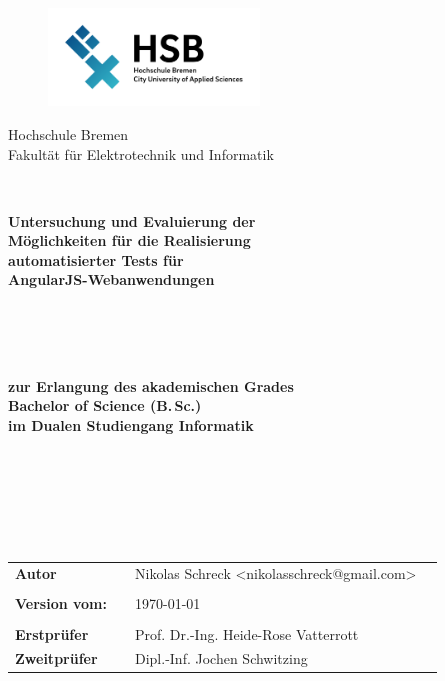 \thispagestyle{empty}


\begin{figure}[t]
 \centering
 \includegraphics[width=0.5\textwidth]{abb/logo}
\end{figure}

\begin{center}
\Large{Hochschule Bremen}\\
\Large{Fakultät für Elektrotechnik und Informatik}\\
\end{center}



\begin{verbatim}


\end{verbatim}
\begin{center}
\onehalfspacing
\textbf{\LARGE{Untersuchung und Evaluierung der \\ Möglichkeiten für die Realisierung \\ automatisierter Tests für \\AngularJS-Webanwendungen \\}}
\singlespacing
\begin{verbatim}



\end{verbatim}
\textbf{\titleDocument \\ zur Erlangung des akademischen Grades \\ Bachelor of Science (B.\,Sc.) \\ im Dualen Studiengang Informatik}
\end{center}
\begin{verbatim}






\end{verbatim}
\begin{flushleft}
\begin{tabular}{llll}
\textbf{Autor} & & Nikolas Schreck <nikolasschreck@gmail.com> & \\
& & \\
\textbf{Version vom:} & & \today &\\
& & \\
\textbf{Erstprüfer} & & Prof. Dr.-Ing. Heide-Rose Vatterrott&\\
\textbf{Zweitprüfer} & & Dipl.-Inf. Jochen Schwitzing&\\
\end{tabular}
\end{flushleft}